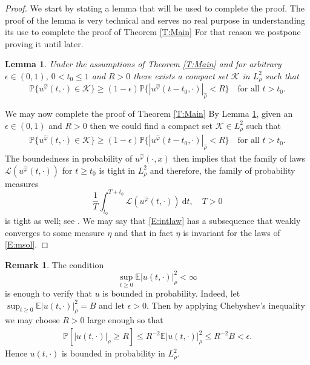 \documentclass[a4paper,11pt]{article}%
\numberwithin{equation}{section}
\theoremstyle{plain}
\newtheorem{lemma}[theorem]{Lemma}
\theoremstyle{definition}
\newtheorem{remark}[theorem]{Remark}
\newcommand{\E}{\mathbb{E}}
\newcommand{\ud}{\ensuremath{ \mathrm{d} }}
\begin{document}
\begin{proof}
	We start by stating a lemma that will be used to complete the proof.
	The proof of the lemma is very technical and serves no real purpose in understanding its use to complete
	the proof of Theorem \ref{T:Main} For that reason we postpone proving it until later.

\begin{lemma}
	\label{L:Main}
Under the assumptions of Theorem \ref{T:Main} and for arbitrary $\epsilon \in (0,1)$, $0< t_0 \le 1$ and $R>0$ there exists a compact set $\mathscr K$ in $L^2_{ \rho}$ such that
 \begin{equation}
	 \label{E:cpt}
	\mathbb{P}\{u^{\hat{\varphi}}(t,\cdot) \in \mathscr K \} \ge (1-\epsilon)\mathbb{P}\{|u^{
	\hat{\varphi}}(t-t_0,\cdot)|_{\hat \rho} < R\} \quad \text{for all $t>t_0$}.
 \end{equation}
\end{lemma}

 We may now complete the proof of Theorem \ref{T:Main} By Lemma \ref{L:Main}, given an $\epsilon \in (0,1)$ and $R>0$ then we could find a compact set $\mathscr K \in L^2_{\rho}$ such that
 \begin{align*}
	 \mathbb{P}\{u^{\hat \varphi}(t,\cdot) \in \mathscr K \} \ge (1-\epsilon)\mathbb{P}\{|u^{\hat \varphi}(t-t_0,\cdot)|_{\hat \rho} < R\} \quad \text{for all $t>t_0$} .
 \end{align*}
The boundedness in probability of $u^{\hat \varphi}(\cdot,x)$ then implies that the family of laws
$\mathscr L(u^{\hat \varphi}(t,\cdot))$ for $t \ge t_0$ is tight in $L^2_{\rho}$ and therefore,
the family of probability measures
 \begin{equation}
	 \label{E:intlaw}
	 \dfrac{1}{T}\int_{t_0}^{T+t_0} \mathscr L(u^{\hat \varphi}(t,\cdot))\: \ud t, \quad T>0
 \end{equation}
 is tight as well; see \cite[Corollary 3.1.2]{DZ96}.
 We may say that \eqref{E:intlaw} has a subsequence that weakly converges to some measure $\eta$ and that in fact $\eta$
 is invariant for the laws of \eqref{E:msol}.
 \end{proof}


 \begin{remark}
 	The condition \begin{equation} \sup_{t \ge 0} \E |u(t,\cdot)|_\rho^2 < \infty \label{E:bipc} \end{equation}
 	is enough to verify that $u$ is bounded in probability.
	Indeed, let $\sup_{t\ge 0} \E |u(t,\cdot)|_\rho^2 = B$ and let $\epsilon >0$.
	Then by applying Chebyshev's inequality we may choose $R>0$ large enough so that
 	\begin{align*}
		\mathbb{P}[|u(t,\cdot)|_\rho \ge R] \le R^{-2}\E |u(t,\cdot)|_\rho^2 \le R^{-2}B < \epsilon.
 	\end{align*}
 	Hence $u(t,\cdot)$ is bounded in probability in $L^2_{\rho}$.
 \end{remark}
\end{document}
